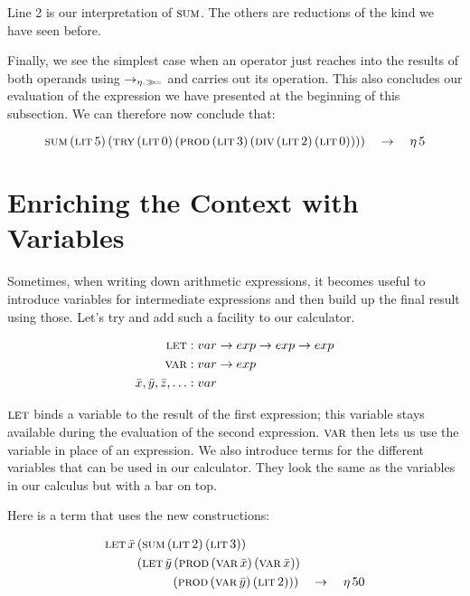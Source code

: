 Line 2 is our interpretation of $\textsc{sum}$. The others are reductions of the
kind we have seen before.

Finally, we see the simplest case when an operator just reaches into the
results of both operands using $\to_{\eta.\mathbin{\gg\!=}}$ and carries out its
operation. This also concludes our evaluation of the expression we have
presented at the beginning of this subsection. We can therefore now
conclude that:

$$
\textsc{sum}\,(\textsc{lit}\,5)\,(\textsc{try}\,(\textsc{lit}\,0)\,(\textsc{prod}\,(\textsc{lit}\,3)\,(\textsc{div}\,(\textsc{lit}\,2)\,(\textsc{lit}\,0))))
\quad \to \quad \eta\,5
$$


\section{Enriching the Context with Variables}
\label{sec:enriching-the-context-with-variables}

Sometimes, when writing down arithmetic expressions, it becomes useful to
introduce variables for intermediate expressions and then build up the
final result using those. Let's try and add such a facility to our
calculator.

\begin{align*}
  \textsc{let} &: var \to exp \to exp \to exp \\
  \textsc{var} &: var \to exp \\
  \bar{x}, \bar{y}, \bar{z},\ldots &: var
\end{align*}

$\textsc{let}$ binds a variable to the result of the first expression; this
variable stays available during the evaluation of the second
expression. $\textsc{var}$ then lets us use the variable in place of an
expression. We also introduce terms for the different variables that can be
used in our calculator. They look the same as the variables in our calculus
but with a bar on top.

Here is a term that uses the new constructions:

\begin{align*}
& \letecn{x}{\sumec{\litec{2}}{\litec{3}}}
 {\\ & \hspace{9mm} \letec{y}{\prodec{\varec{x}}{\varec{x}}}
 {\\ & \hspace{19mm} \prodec{\varec{y}}{\litec{2}}}} \quad \to \quad \ap{\eta}{50}
\end{align*}

